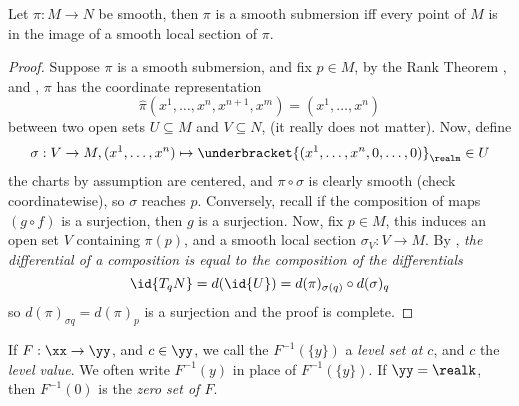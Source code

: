 \documentclass[../main-v2-manifolds.tex]{subfiles}
\begin{document}
\begin{wts}\label{lee-chp4:characterization-of-smooth-submersion}
    Let $\pi:M\to N$ be smooth, then $\pi$ is a smooth submersion iff every point of $M$ is in the image of a smooth local section of $\pi$.
\end{wts}
\begin{proof}
    Suppose $\pi$ is a smooth submersion, and fix $p\in M$, by the Rank Theorem , and , $\pi$ has the coordinate representation
    \[
        \hat{\pi}(x^1,\ldots,x^n,x^{n+1},x^m)=(x^1,\ldots,x^n)
    \]
    between two open sets $U\subseteq M$ and $V\subseteq N$, (it really does not matter). Now, define
    \[
        \sigma: V\to M, (x^1,\ldots,x^n)\mapsto \underbracket{(x^1,\ldots,x^n,0,\ldots,0)}_{\realm}\in U
    \]
    the charts by assumption are centered, and $\pi\circ\sigma$ is clearly smooth (check coordinatewise), so $\sigma$ reaches $p$. Conversely, recall if the composition of maps $(g\circ f)$ is a surjection, then $g$ is a surjection. Now, fix $p\in M$, this induces an open set $V$ containing $\pi(p)$, and a smooth local section $\sigma_V: V\to M$. By , \emph{the differential of a composition is equal to the composition of the differentials}
    \[
        \id{T_{q}N}=d(\id{U})=d(\pi)_{\sigma(q)}\circ d(\sigma)_{q}
    \]
    so $d(\pi)_{\sigma{q}} = d(\pi)_{p}$ is a surjection and the proof is complete.
\end{proof}

If $F:\xx\to\yy$, and $c\in \yy$, we call the $F^{-1}(\{y\})$ a \emph{level set at $c$}, and $c$ the \emph{level value}. We often write $F^{-1}(y)$ in place of $F^{-1}(\{y\})$. If $\yy=\realk$, then $F^{-1}(0)$ is the \emph{zero set of $F$}.
\end{document}
